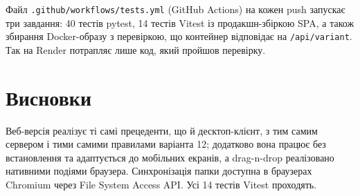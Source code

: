 \documentclass[12pt,a4paper]{article}
\begin{document}
Файл \texttt{.github/\allowbreak{}workflows/\allowbreak{}tests.yml} (GitHub Actions) на кожен push запускає три завдання: 40 тестів pytest, 14 тестів Vitest із продакшн-збіркою SPA, а також збирання Docker-образу з перевіркою, що контейнер відповідає на \texttt{/\allowbreak{}api/\allowbreak{}variant}. Так на Render потрапляє лише код, який пройшов перевірку.


\section{Висновки}

Веб-версія реалізує ті самі прецеденти, що й десктоп-клієнт, з тим самим сервером і тими самими правилами варіанта 12; додатково вона працює без встановлення та адаптується до мобільних екранів, а drag-n-drop реалізовано нативними подіями браузера. Синхронізація папки доступна в браузерах Chromium через File System Access API. Усі 14 тестів Vitest проходять.
\end{document}
